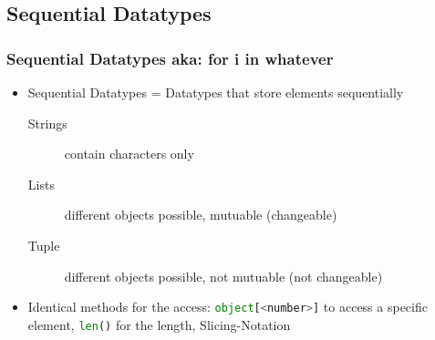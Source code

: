 \documentclass[ngerman]{beamer}
\begin{document}
\subsection{Sequential Datatypes}

\begin{frame}
\frametitle{Sequential Datatypes aka: for i in whatever}

\begin{itemize}
\item Sequential Datatypes = Datatypes that store elements sequentially

\begin{description}
\item[Strings] contain characters only
\item[Lists] different objects possible, mutuable (changeable)
\item[Tuple] different objects possible, not mutuable \newline (not changeable)
\end{description}
\item Identical methods for the access: \lstinline[language={Python}]{object[<number>]} to access a specific element, \lstinline[language={Python}]{len()} for the length, Slicing-Notation
\end{itemize}
\end{frame}

%
%
%
%
%
%
\end{document}
